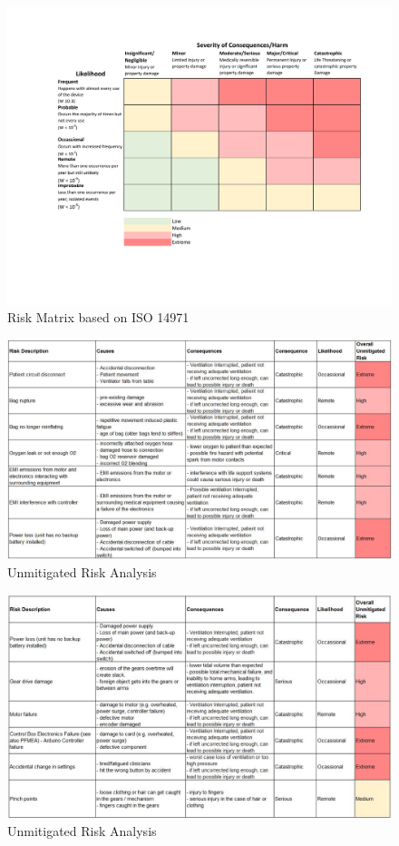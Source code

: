 \documentclass[]{article}
\begin{document}
\begin{appendices}
\begin{figure}
	\includegraphics[scale= 0.9, trim=80 100 40 60, clip]{figures/risk_matrix.pdf}
	\caption{Risk Matrix based on ISO 14971 }
	\label{fig:risk_matrix}
\end{figure}

\begin{figure}
	\includegraphics[scale= 0.6]{figures/unmit_1.jpg}
	\caption{Unmitigated Risk Analysis}
	\label{fig:unmit1}
\end{figure}

\begin{figure}
	\includegraphics[scale= 0.65]{figures/unmit_2.jpg}
	\caption{Unmitigated Risk Analysis}
	\label{fig:unmit2}
\end{figure}


\end{appendices}
\end{document}
